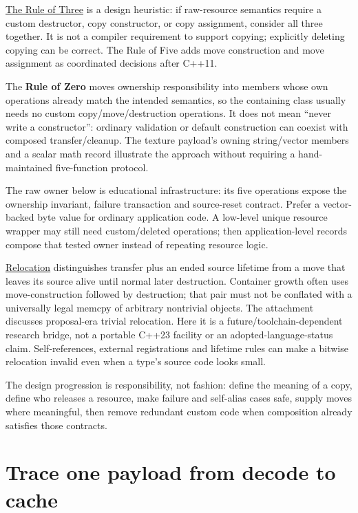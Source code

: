 \hyperref[appendix-7679107d057e]{The Rule of Three} is a design heuristic: if raw-resource semantics require a custom destructor, copy constructor, or copy assignment, consider all three together. It is not a compiler requirement to support copying; explicitly deleting copying can be correct. The Rule of Five adds move construction and move assignment as coordinated decisions after C++11.

The \textbf{Rule of Zero} moves ownership responsibility into members whose own operations already match the intended semantics, so the containing class usually needs no custom copy/move/destruction operations. It does not mean ``never write a constructor'': ordinary validation or default construction can coexist with composed transfer/cleanup. The texture payload's owning string/vector members and a scalar math record illustrate the approach without requiring a hand-maintained five-function protocol.

The raw owner below is educational infrastructure: its five operations expose the ownership invariant, failure transaction and source-reset contract. Prefer a vector-backed byte value for ordinary application code. A low-level unique resource wrapper may still need custom/deleted operations; then application-level records compose that tested owner instead of repeating resource logic.

\hyperref[appendix-adfd6397af8d]{Relocation} distinguishes transfer plus an ended source lifetime from a move that leaves its source alive until normal later destruction. Container growth often uses move-construction followed by destruction; that pair must not be conflated with a universally legal memcpy of arbitrary nontrivial objects. The attachment discusses proposal-era trivial relocation. Here it is a future/toolchain-dependent research bridge, not a portable C++23 facility or an adopted-language-status claim. Self-references, external registrations and lifetime rules can make a bitwise relocation invalid even when a type's source code looks small.

The design progression is responsibility, not fashion: define the meaning of a copy, define who releases a resource, make failure and self-alias cases safe, supply moves where meaningful, then remove redundant custom code when composition already satisfies those contracts.

\section{Trace one payload from decode to cache}\label{01-foundations-i-ch003-trace-one-payload-from-decode-to-cache}

